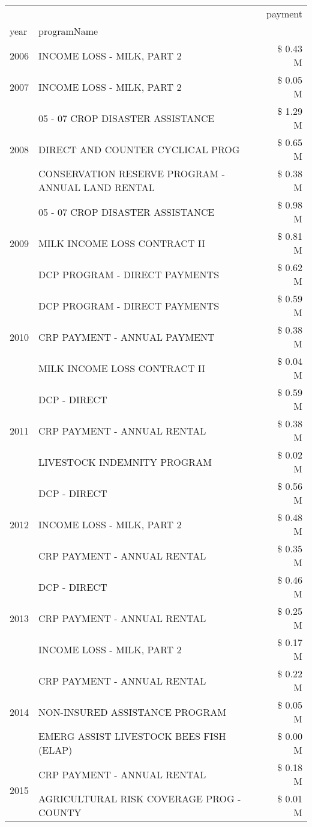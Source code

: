 \begin{tabular}{llr}
\toprule
 &  & payment \\
year & programName &  \\
\midrule
2006 & INCOME LOSS - MILK, PART 2 & \$ 0.43 M \\
\cline{1-3}
2007 & INCOME LOSS - MILK, PART 2 & \$ 0.05 M \\
\cline{1-3}
\multirow[t]{3}{*}{2008} & 05 - 07 CROP DISASTER ASSISTANCE & \$ 1.29 M \\
 & DIRECT AND COUNTER CYCLICAL PROG & \$ 0.65 M \\
 & CONSERVATION RESERVE PROGRAM - ANNUAL LAND RENTAL & \$ 0.38 M \\
\cline{1-3}
\multirow[t]{3}{*}{2009} & 05 - 07 CROP DISASTER ASSISTANCE & \$ 0.98 M \\
 & MILK INCOME LOSS CONTRACT II & \$ 0.81 M \\
 & DCP PROGRAM - DIRECT PAYMENTS & \$ 0.62 M \\
\cline{1-3}
\multirow[t]{3}{*}{2010} & DCP PROGRAM - DIRECT PAYMENTS & \$ 0.59 M \\
 & CRP PAYMENT - ANNUAL PAYMENT & \$ 0.38 M \\
 & MILK INCOME LOSS CONTRACT II & \$ 0.04 M \\
\cline{1-3}
\multirow[t]{3}{*}{2011} & DCP - DIRECT & \$ 0.59 M \\
 & CRP PAYMENT - ANNUAL RENTAL & \$ 0.38 M \\
 & LIVESTOCK INDEMNITY PROGRAM & \$ 0.02 M \\
\cline{1-3}
\multirow[t]{3}{*}{2012} & DCP - DIRECT & \$ 0.56 M \\
 & INCOME LOSS - MILK, PART 2 & \$ 0.48 M \\
 & CRP PAYMENT - ANNUAL RENTAL & \$ 0.35 M \\
\cline{1-3}
\multirow[t]{3}{*}{2013} & DCP - DIRECT & \$ 0.46 M \\
 & CRP PAYMENT - ANNUAL RENTAL & \$ 0.25 M \\
 & INCOME LOSS - MILK, PART 2 & \$ 0.17 M \\
\cline{1-3}
\multirow[t]{3}{*}{2014} & CRP PAYMENT - ANNUAL RENTAL & \$ 0.22 M \\
 & NON-INSURED ASSISTANCE PROGRAM & \$ 0.05 M \\
 & EMERG ASSIST LIVESTOCK BEES FISH (ELAP) & \$ 0.00 M \\
\cline{1-3}
\multirow[t]{3}{*}{2015} & CRP PAYMENT - ANNUAL RENTAL & \$ 0.18 M \\
 & AGRICULTURAL RISK COVERAGE PROG - COUNTY & \$ 0.01 M \\

\end{tabular}
